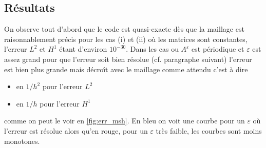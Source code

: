 \documentclass[11pt]{article}
\begin{document}
\subsection{Résultats}

On observe tout d'abord que le code est quasi-exacte dès que la maillage est raisonnablement précis pour les cas (i) et (ii) où les matrices sont
constantes, l'erreur $L^2$ et $H^1$ étant d'environ $10^{-30}$.
Dans les cas ou $A^\varepsilon$ est périodique et $\varepsilon$ est assez grand pour que l'erreur soit bien résolue (cf. paragraphe suivant) l'erreur est bien plus grande mais décroît avec le maillage comme attendu c'est à dire
\begin{itemize}
\item en $1/h^2$ pour l'erreur $L^2$
\item en $1/h$ pour l'erreur $H^1$
\end{itemize}
comme on peut le voir en \autoref{fig:err_msh}. En bleu on voit une courbe pour un $\varepsilon$ où l'erreur est résolue alors qu'en rouge, pour un $\varepsilon$ très
faible, les courbes sont moins monotones. 
\end{document}
